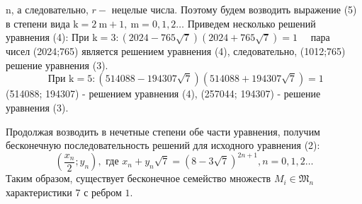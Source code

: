 \documentclass[a4paper,openbib]{article}
\begin{document}
n, а следовательно, $r-$ нецелые числа. Поэтому будем возводить выражение
(5) в степени вида $\mathrm{k}=2 \mathrm{~m}+1, \mathrm{~m}=0,1,2 \ldots$
Приведем несколько решений уравнения (4):
При $\mathrm{k}=3:(2024-765 \sqrt{7})(2024+765 \sqrt{7})=1 \quad$ пара $\quad$ чисел
(2024;765) является решением уравнения (4), следовательно, (1012;765) решение уравнения (3).
$$
\text { При } \mathrm{k}=5:(514088-194307 \sqrt{7})(514088+194307 \sqrt{7})=1
$$
(514088; 194307) - решением уравнения (4), (257044; 194307) - решение уравнения (3).

Продолжая возводить в нечетные степени обе части уравнения, получим бесконечную последовательность решений для исходного уравнения (2):
$$
\left(\frac{x_{n}}{2} ; y_{n}\right), \text { где } x_{n}+y_{n} \sqrt{7}=(8-3 \sqrt{7})^{2 n+1}, n=0,1,2 \ldots
$$
Таким образом, существует бесконечное семейство множеств $M_{i} \in \mathfrak{M}_{n}$ характеристики 7 с ребром $1 .$
\end{document}
